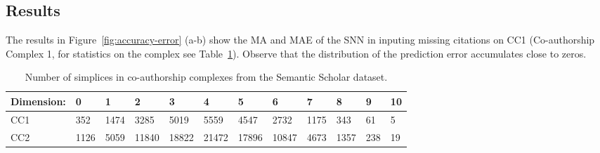 \subsection{Results}
The results in Figure~\ref{fig:accuracy-error} (a-b) show the MA and MAE of the SNN in inputing missing citations on CC1 (Co-authorship Complex 1, for statistics on the complex see Table~\ref{table:Simplices-coauthor}). Observe that the distribution of the prediction error accumulates close to zeros.
\begin{table}[htbp]\label{table:Simplices-coauthor}
  \centering
  \scriptsize{
  \begin{tabular}{llllllllllll}
    \cmidrule(r){1-12}
    Dimension:   & 0     & 1  & 2     & 3 & 4     & 5 & 6    & 7 & 8   & 9 & 10\\
    \midrule
    CC1 & 352  & 1474  & 3285  & 5019  & 5559  & 4547  & 2732  & 1175  & 343 & 61 & 5\\
    CC2 & 1126 & 5059 & 11840 & 18822 & 21472 & 17896  & 10847 & 4673 & 1357 & 238 & 19\\ 
    \bottomrule
  \end{tabular}}
  \vspace{2pt}
  \caption{%
  Number of simplices in co-authorship complexes from the Semantic Scholar dataset.
  }
\end{table}
